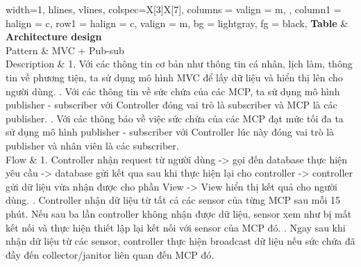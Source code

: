    	\begin{tblr}{
   			width=1\linewidth,
   			hlines,
   			vlines,
   			colspec={X[3]X[7]},
   			columns = {valign = m, },
			column{1} = {halign = c},
   			row{1} = {halign = c, valign = m, bg = lightgray, fg = black},
   		}
   		{\textbf{Table} & \textbf{Architecture design}}  \\
   		Pattern		& 	MVC + Pub-sub \\
   		Description & 	1. Với các thông tin cơ bản như thông tin cá nhân, lịch làm, thông tin về phương tiện, ta sử dụng mô hình MVC để lấy dữ liệu và hiển thị lên cho người dùng. \newline
						. Với các thông tin về sức chứa của các MCP, ta sử dụng mô hình publisher - subscriber với Controller đóng vai trò là subscriber và MCP là các publisher. \newline
						. Với các thông báo về việc sức chứa của các MCP đạt mức tối đa ta sử dụng mô hình publisher - subscriber với Controller lúc này đóng vai trò là publisher và nhân viên là các subscriber. \\
		Flow & 			1. Controller nhận request từ người dùng -> gọi đến database thực hiện yêu cầu -> database gửi kết qua sau khi thực hiện lại cho controller -> controller gửi dữ liệu vừa nhận được cho phần View -> View hiển thị kết quả cho người dùng. \newline
						. Controller nhận dữ liệu từ tất cả các sensor của từng MCP sau mỗi 15 phút. Nếu sau ba lần controller không nhận được dữ liệu, sensor xem như bị mất kết nối và thực hiện thiết lập lại kết nối với sensor của MCP đó. \newline
						. Ngay sau khi nhận dữ liệu từ các sensor, controller thực hiện broadcast dữ liệu nếu sức chứa đã đầy đến collector/janitor liên quan đến MCP đó. \\
   	\end{tblr}
  
   	\vspace{0.5cm}

